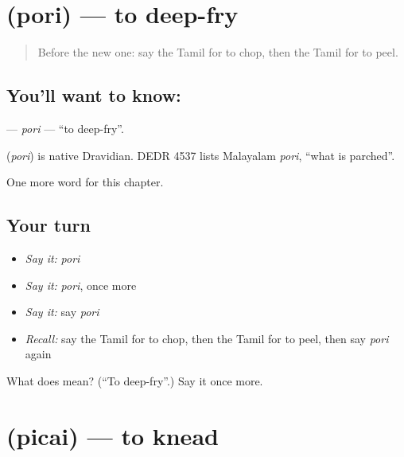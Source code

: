 \section[\texorpdfstring{\ta{பொரி} (pori)}{பொரி (pori)}]{ (pori) — to deep-fry}

\label{lesson:TA-C194-pori}



\begin{quote}
Before the new one: say the Tamil for to chop, then the Tamil for to peel.
\end{quote}

\subsection*{You'll want to know: }
\textbf{} — \emph{pori} — \textquotedblleft{}to deep-fry\textquotedblright{}.

\begin{cousinweb}
\textbf{} (\emph{pori}) is native Dravidian. DEDR 4537 lists Malayalam \emph{pori}, \textquotedblleft{}what is parched\textquotedblright{}.
\end{cousinweb}

\begin{grammarlens}[title={What you've built}]
One more word for this chapter.
\end{grammarlens}

\subsection*{Your turn}
\begin{itemize}
\raggedright
  \item \emph{Say it:} \emph{pori}
  \item \emph{Say it:} \emph{pori}, once more
  \item \emph{Say it:} say \emph{pori}
  \item \emph{Recall:} say the Tamil for to chop, then the Tamil for to peel, then say \emph{pori} again
\end{itemize}

\begin{tcolorbox}[breakable,colback=teal!4,colframe=teal!35!black,title={Before you move on}]
What does  mean? (\textquotedblleft{}To deep-fry\textquotedblright{}.) Say it once more.
\end{tcolorbox}
\section[\texorpdfstring{\ta{பிசை} (picai)}{பிசை (picai)}]{ (picai) — to knead}

